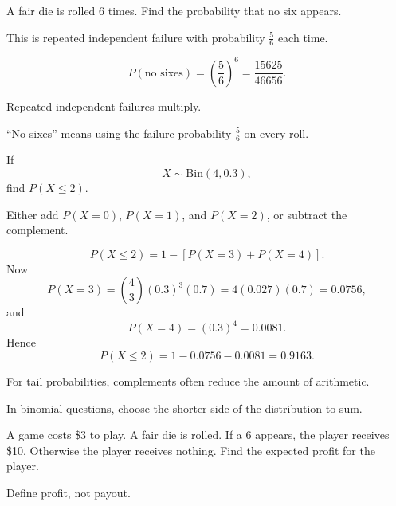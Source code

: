 \begin{problem}
A fair die is rolled $6$ times. Find the probability that no six appears.
\end{problem}

\begin{hint}
This is repeated independent failure with probability $\frac56$ each time.
\end{hint}

\begin{solution}
\[
P(\text{no sixes})=\left(\frac56\right)^6=\frac{15625}{46656}.
\]
\end{solution}

\begin{takeaways}
\item Repeated independent failures multiply.
\item ``No sixes'' means using the failure probability $\frac56$ on every roll.
\end{takeaways}

\begin{problem}
If
\[
X\sim \mathrm{Bin}(4,0.3),
\]
find $P(X\le 2)$.
\end{problem}

\begin{hint}
Either add $P(X=0)$, $P(X=1)$, and $P(X=2)$, or subtract the complement.
\end{hint}

\begin{solution}
\[
P(X\le 2)=1-[P(X=3)+P(X=4)].
\]
Now
\[
P(X=3)=\binom43(0.3)^3(0.7)=4(0.027)(0.7)=0.0756,
\]
and
\[
P(X=4)=(0.3)^4=0.0081.
\]
Hence
\[
P(X\le 2)=1-0.0756-0.0081=0.9163.
\]
\end{solution}

\begin{takeaways}
\item For tail probabilities, complements often reduce the amount of arithmetic.
\item In binomial questions, choose the shorter side of the distribution to sum.
\end{takeaways}

\begin{problem}
A game costs \$3 to play. A fair die is rolled. If a $6$ appears, the player receives \$10. Otherwise the player receives nothing. Find the expected profit for the player.
\end{problem}

\begin{hint}
Define profit, not payout.
\end{hint}

